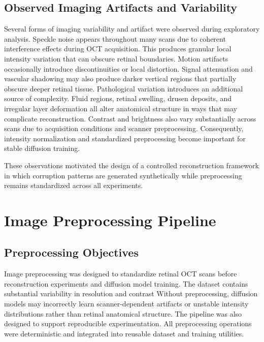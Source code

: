 \documentclass[12pt,oneside]{article}
\begin{document}
\subsection*{Observed Imaging Artifacts and Variability}

Several forms of imaging variability and artifact were observed during exploratory analysis.
Speckle noise appears throughout many scans due to coherent interference effects during OCT acquisition. This produces granular local intensity variation that can obscure retinal boundaries.
Motion artifacts occasionally introduce discontinuities or local distortion. Signal attenuation and vascular shadowing may also produce darker vertical regions that partially obscure deeper retinal tissue.
Pathological variation introduces an additional source of complexity. Fluid regions, retinal swelling, drusen deposits, and irregular layer deformation all alter anatomical structure in ways that may complicate reconstruction.
Contrast and brightness also vary substantially across scans due to acquisition conditions and scanner preprocessing. Consequently, intensity normalization and standardized preprocessing become important for stable diffusion training.

These observations motivated the design of a controlled reconstruction framework in which corruption patterns are generated synthetically while preprocessing remains standardized across all experiments.

\section{Image Preprocessing Pipeline}

\subsection*{Preprocessing Objectives}

Image preprocessing was designed to standardize retinal OCT scans before reconstruction experiments and diffusion model training. The dataset contains substantial variability in resolution and contrast
Without preprocessing, diffusion models may incorrectly learn scanner-dependent artifacts or unstable intensity distributions rather than retinal anatomical structure.
The pipeline was also designed to support reproducible experimentation. All preprocessing operations were deterministic and integrated into reusable dataset and training utilities.
\end{document}
